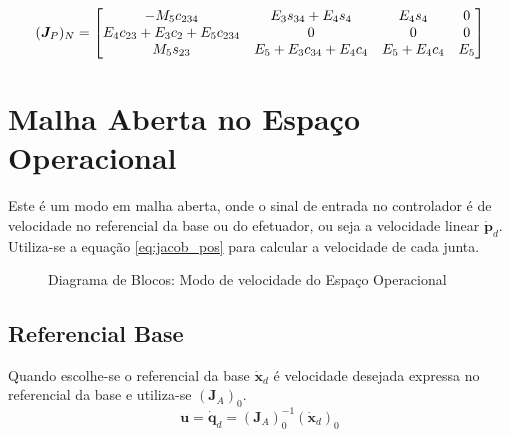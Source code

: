 \begin{equation}
(\bm{J}_P)_N =  
\begin{bmatrix}
    -M_5c_{234} & E_3s_{34}+E_4s_4 & E_4s_4 & 0 \\
    E_4c_{23}+E_3c_2+E_5c_{234} & 0 & 0 & 0 \\
    M_5s_{23} &  E_5+E_3c_{34}+E_4c_4 & E_5+E_4c_4 & E_5 
\end{bmatrix}
\end{equation}




\section{Malha Aberta no Espaço Operacional}
Este é um modo em malha aberta, onde o sinal de entrada no controlador é de velocidade no referencial da base ou do efetuador, ou seja a velocidade linear $\bm{\dot{p}}_d$. Utiliza-se a equação \eqref{eq:jacob_pos} para calcular a velocidade de cada junta. 

\begin{figure}[h!]
\centering
{}
\caption{Diagrama de Blocos: Modo de velocidade do Espaço Operacional}
\label{fig:vel_op}
\end{figure}


\subsection{Referencial Base}
Quando escolhe-se o referencial da base $\bm{\dot{x}}_d$ é velocidade desejada expressa no referencial da base e utiliza-se $(\bm{J}_{A})_0$.
\begin{equation}
\bm{u} = \bm{\dot{q}}_d = (\bm{J}_{A})_0^{-1} (\bm{\dot{x}}_d)_0
\end{equation}
